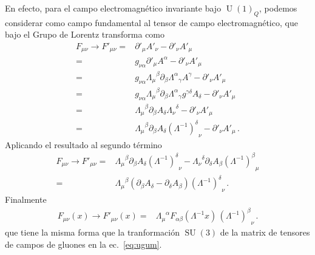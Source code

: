 \begin{frame}
En efecto, para el campo electromagnético invariante bajo $\operatorname{U}(1)_Q$, podemos considerar como campo fundamental al tensor de campo electromagnético, que bajo el Grupo de Lorentz transforma como
\begin{align}
  F_{\mu\nu} \to F'_{\mu\nu}=&\partial'_{\mu} A'_{\nu} -\partial'_{\nu} A'_{\mu} \nonumber\\
=&g_{\nu\alpha}\partial'_{\mu} A^{\alpha} -\partial'_{\nu} {A'}_{\mu} \nonumber\\
=&g_{\nu\alpha} { \Lambda_{\mu}}^{\beta}\partial_{\beta} {\Lambda^{\alpha}}_{\gamma} {A}^{\gamma} -\partial'_{\nu} {A'}_{\mu} \nonumber\\
=&g_{\nu\alpha} { \Lambda_{\mu}}^{\beta}\partial_{\beta} {\Lambda^{\alpha}}_{\gamma} g^{\gamma\delta} A_{\delta} -\partial'_{\nu} A'_{\mu} \nonumber\\
  =& { \Lambda_{\mu}}^{\beta}\partial_{\beta}   A_{\delta}{\Lambda_{\nu}}^{\delta} -\partial'_{\nu} A'_{\mu} \nonumber\\
  =& { \Lambda_{\mu}}^{\beta}\partial_{\beta}   A_{\delta}{\left( \Lambda^{-1} \right)^{\delta}}_{\nu} -\partial'_{\nu} A'_{\mu} \,.
\end{align}
Aplicando el resultado al segundo término
\begin{align}
  F_{\mu\nu} \to F'_{\mu\nu} =& { \Lambda_{\mu}}^{\beta}\partial_{\beta}   A_{\delta}{\left( \Lambda^{-1} \right)^{\delta}}_{\nu} 
     - { \Lambda_{\nu}}^{\delta}\partial_{\delta} A_{\beta}{\left( \Lambda^{-1} \right)^{\beta}}_{\mu}  \nonumber\\
  =& { \Lambda_{\mu}}^{\beta} \left( \partial_{\beta}   A_{\delta}-      \partial_{\delta} A_{\beta} \right)
{\left( \Lambda^{-1} \right)^{\delta}}_{\nu} \,.
\end{align}
Finalmente
\begin{align}
  F_{\mu\nu}(x) \to F'_{\mu\nu}(x)  =& { \Lambda_{\mu}}^{\alpha}F_{\alpha\beta}\left( \Lambda^{-1}x \right)\,
                   {\left( \Lambda^{-1} \right)^{\beta}}_{\nu} \,.
\end{align}
que tiene la misma forma que la tranformación $\operatorname{SU}(3)$ de la matrix de tensores de campos de gluones en la ec.~\eqref{eq:ugum}.


\end{frame}
